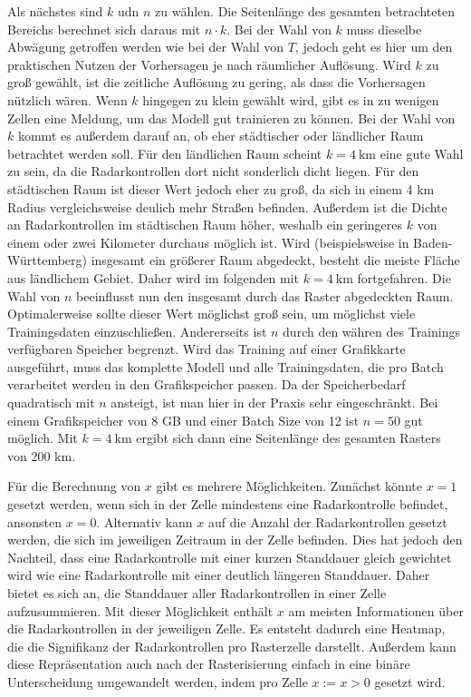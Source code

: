 Als nächstes sind $k$ udn $n$ zu wählen.
Die Seitenlänge des gesamten betrachteten Bereichs berechnet sich daraus mit $n \cdot k$.
Bei der Wahl von $k$ muss dieselbe Abwägung getroffen werden wie bei der Wahl von $T$, jedoch geht es hier um den praktischen Nutzen der Vorhersagen je nach räumlicher Auflösung.
Wird $k$ zu groß gewählt, ist die zeitliche Auflösung zu gering, als dass die Vorhersagen nützlich wären.
Wenn $k$ hingegen zu klein gewählt wird, gibt es in zu wenigen Zellen eine Meldung, um das Modell gut trainieren zu können.
Bei der Wahl von $k$ kommt es außerdem darauf an, ob eher städtischer oder ländlicher Raum betrachtet werden soll.
Für den ländlichen Raum scheint $k = 4~\text{km}$ eine gute Wahl zu sein, da die Radarkontrollen dort nicht sonderlich dicht liegen.
Für den städtischen Raum ist dieser Wert jedoch eher zu groß, da sich in einem 4 km Radius vergleichsweise deulich mehr Straßen befinden.
Außerdem ist die Dichte an Radarkontrollen im städtischen Raum höher, weshalb ein geringeres $k$ von einem oder zwei Kilometer durchaus möglich ist.
Wird (beispielsweise in Baden-Württemberg) insgesamt ein größerer Raum abgedeckt, besteht die meiste Fläche aus ländlichem Gebiet.
Daher wird im folgenden mit $k = 4~\text{km}$ fortgefahren.
Die Wahl von $n$ beeinflusst nun den insgesamt durch das Raster abgedeckten Raum.
Optimalerweise sollte dieser Wert möglichst groß sein, um möglichst viele Trainingsdaten einzuschließen.
Andererseits ist $n$ durch den währen des Trainings verfügbaren Speicher begrenzt.
Wird das Training auf einer Grafikkarte ausgeführt, muss das komplette Modell und alle Trainingsdaten, die pro Batch verarbeitet werden in den Grafikspeicher passen.
Da der Speicherbedarf quadratisch mit $n$ ansteigt, ist man hier in der Praxis sehr eingeschränkt.
Bei einem Grafikspeicher von 8 GB und einer Batch Size von 12 ist $n = 50$ gut möglich.
Mit $k = 4~\text{km}$ ergibt sich dann eine Seitenlänge des gesamten Rasters von 200 km.

Für die Berechnung von $x$ gibt es mehrere Möglichkeiten.
Zunächst könnte $x = 1$ gesetzt werden, wenn sich in der Zelle mindestens eine Radarkontrolle befindet, ansonsten $x = 0$.
Alternativ kann $x$ auf die Anzahl der Radarkontrollen gesetzt werden, die sich im jeweiligen Zeitraum in der Zelle befinden.
Dies hat jedoch den Nachteil, dass eine Radarkontrolle mit einer kurzen Standdauer gleich gewichtet wird wie eine Radarkontrolle mit einer deutlich längeren Standdauer.
Daher bietet es sich an, die Standdauer aller Radarkontrollen in einer Zelle aufzusummieren.
Mit dieser Möglichkeit enthält $x$ am meisten Informationen über die Radarkontrollen in der jeweiligen Zelle.
Es entsteht dadurch eine Heatmap, die die Signifikanz der Radarkontrollen pro Rasterzelle darstellt.
Außerdem kann diese Repräsentation auch nach der Rasterisierung einfach in eine binäre Unterscheidung umgewandelt werden, indem pro Zelle $x := x > 0$ gesetzt wird.

